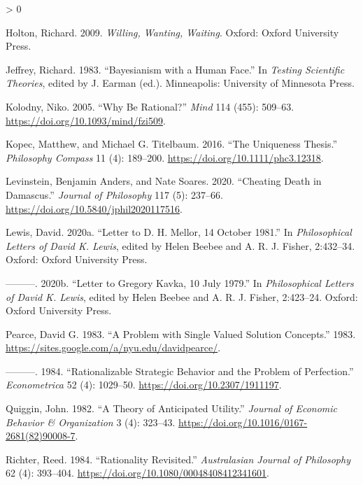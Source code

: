 \documentclass[
  12pt,
]{article}
\newlength{\cslhangindent}
\newenvironment{CSLReferences}[2] %
 {%
  \setlength{\parindent}{0pt}
  \ifodd #1 \everypar{\setlength{\hangindent}{\cslhangindent}}\ignorespaces\fi
  \ifnum #2 > 0
  \setlength{\parskip}{#2\baselineskip}
  \fi
 }%
 {}
\begin{document}
\begin{CSLReferences}{1}{0}
\leavevmode\hypertarget{ref-Holton2009}{}%
Holton, Richard. 2009. \emph{Willing, Wanting, Waiting}. Oxford: Oxford
University Press.

\leavevmode\hypertarget{ref-Jeffrey1983}{}%
Jeffrey, Richard. 1983. {``Bayesianism with a Human Face.''} In
\emph{Testing Scientific Theories}, edited by J. Earman (ed.).
Minneapolis: University of Minnesota Press.

\leavevmode\hypertarget{ref-Kolodny2005}{}%
Kolodny, Niko. 2005. {``Why Be Rational?''} \emph{Mind} 114 (455):
509--63. \url{https://doi.org/10.1093/mind/fzi509}.

\leavevmode\hypertarget{ref-KopecTitelbaum2016}{}%
Kopec, Matthew, and Michael G. Titelbaum. 2016. {``The Uniqueness
Thesis.''} \emph{Philosophy Compass} 11 (4): 189--200.
\url{https://doi.org/10.1111/phc3.12318}.

\leavevmode\hypertarget{ref-LevinsteinSoares2020}{}%
Levinstein, Benjamin Anders, and Nate Soares. 2020. {``Cheating Death in
Damascus.''} \emph{Journal of Philosophy} 117 (5): 237--66.
\url{https://doi.org/10.5840/jphil2020117516}.

\leavevmode\hypertarget{ref-Lewis-Mellor-14101981}{}%
Lewis, David. 2020a. {``Letter to {D}. H. Mellor, 14 October 1981.''} In
\emph{Philosophical Letters of David {K}. Lewis}, edited by Helen Beebee
and A. R. J. Fisher, 2:432--34. Oxford: Oxford University Press.

\leavevmode\hypertarget{ref-Lewis-Kavka-10071979}{}%
---------. 2020b. {``Letter to Gregory Kavka, 10 July 1979.''} In
\emph{Philosophical Letters of David {K}. Lewis}, edited by Helen Beebee
and A. R. J. Fisher, 2:423--24. Oxford: Oxford University Press.

\leavevmode\hypertarget{ref-Pearce1983}{}%
Pearce, David G. 1983. {``A Problem with Single Valued Solution
Concepts.''} 1983.
\url{https://sites.google.com/a/nyu.edu/davidpearce/}.

\leavevmode\hypertarget{ref-Pearce1984}{}%
---------. 1984. {``Rationalizable Strategic Behavior and the Problem of
Perfection.''} \emph{Econometrica} 52 (4): 1029--50.
\url{https://doi.org/10.2307/1911197}.

\leavevmode\hypertarget{ref-Quiggin1982}{}%
Quiggin, John. 1982. {``A Theory of Anticipated Utility.''}
\emph{Journal of Economic Behavior \& Organization} 3 (4): 323--43.
\url{https://doi.org/10.1016/0167-2681(82)90008-7}.

\leavevmode\hypertarget{ref-Richter1984}{}%
Richter, Reed. 1984. {``Rationality Revisited.''} \emph{Australasian
Journal of Philosophy} 62 (4): 393--404.
\url{https://doi.org/10.1080/00048408412341601}.


\end{CSLReferences}
\end{document}
